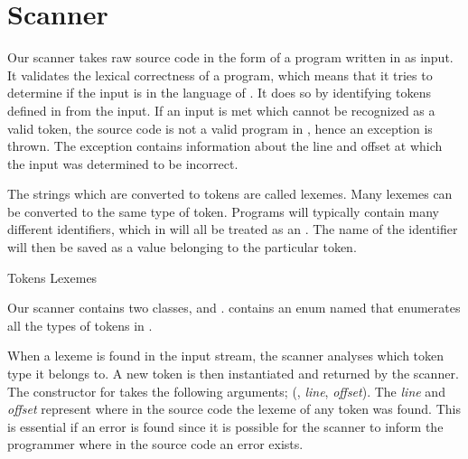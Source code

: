 \section{Scanner}
Our scanner takes raw source code in the form of a program written in \productname{} as input. It validates the lexical correctness of a \productname{} program, which means that it tries to determine if the input is in the language of \productname{}. It does so by identifying tokens defined in \productname{} from the input. If an input is met which cannot be recognized as a valid token, the source code is not a valid program in \productname{}, hence an exception is thrown. The exception contains information about the line and offset at which the input was determined to be incorrect.

The strings which are converted to tokens are called lexemes. Many lexemes can be converted to the same type of token. Programs will typically contain many different identifiers, which in \productname{} will all be treated as an . The name of the identifier will then be saved as a value belonging to the particular token.

                 {Tokens}
       {Lexemes	}{						}{
\tabrow{$[$    	}{ LBRACKET				}
\tabrow{$]$		}{ RBRACKET 			}
}

Our scanner contains two classes,  and .  contains an enum named  that enumerates all the types of tokens in \productname{}. 

When a lexeme is found in the input stream, the scanner analyses which token type it belongs to. A new token is then instantiated and returned by the scanner. The constructor for  takes the following arguments; (, \textit{line}, \textit{offset}). The \textit{line} and \textit{offset} represent where in the source code the lexeme of any token was found. This is essential if an error is found since it is possible for the scanner to inform the programmer where in the source code an error exists.

